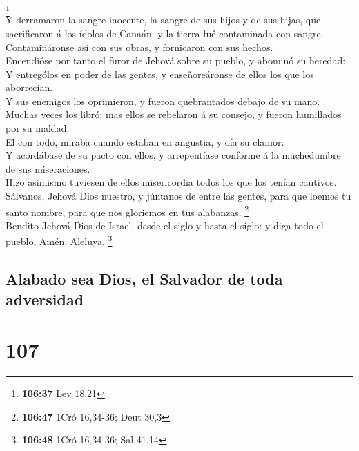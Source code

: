 \footnote{\textbf{106:37} Lev 18,21}\\
 Y derramaron la sangre inocente, la sangre de sus hijos
y de sus hijas, que sacrificaron á los ídolos de Canaán: y la tierra fué
contaminada con sangre.\\
 Contamináronse así con sus obras, y fornicaron con sus
hechos.\\
 Encendióse por tanto el furor de Jehová sobre su pueblo,
y abominó su heredad:\\
 Y entrególos en poder de las gentes, y enseñoreáronse de
ellos los que los aborrecían.\\
 Y sus enemigos los oprimieron, y fueron quebrantados
debajo de su mano.\\
 Muchas veces los libró; mas ellos se rebelaron á su
consejo, y fueron humillados por su maldad.\\
 El con todo, miraba cuando estaban en angustia, y oía su
clamor:\\
 Y acordábase de su pacto con ellos, y arrepentíase
conforme á la muchedumbre de sus miseraciones.\\
 Hizo asimismo tuviesen de ellos misericordia todos los
que los tenían cautivos.\\
 Sálvanos, Jehová Dios nuestro, y júntanos de entre las
gentes, para que loemos tu santo nombre, para que nos gloriemos en tus
alabanzas. \footnote{\textbf{106:47} 1Cró 16,34-36; Deut 30,3}\\
 Bendito Jehová Dios de Israel, desde el siglo y hasta el
siglo: y diga todo el pueblo, Amén. Aleluya. \footnote{\textbf{106:48}
  1Cró 16,34-36; Sal 41,14}

\hypertarget{alabado-sea-dios-el-salvador-de-toda-adversidad}{%
\subsection{Alabado sea Dios, el Salvador de toda
adversidad}\label{alabado-sea-dios-el-salvador-de-toda-adversidad}}

\hypertarget{section-106}{%
\section{107}\label{section-106}}

